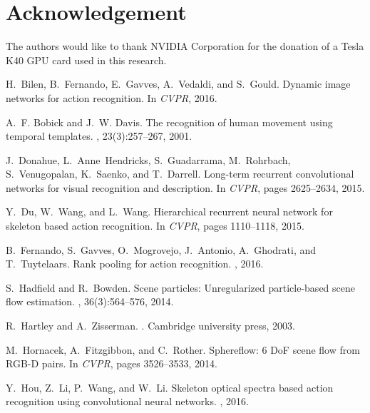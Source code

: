 \documentclass[10pt,twocolumn,letterpaper]{article}
\begin{document}
\section*{Acknowledgement}
The authors would like to thank NVIDIA Corporation for the donation of a Tesla K40 GPU card used in this research.

\small 
\begin{thebibliography}{10}\itemsep=-1pt

H.~Bilen, B.~Fernando, E.~Gavves, A.~Vedaldi, and S.~Gould.
\newblock Dynamic image networks for action recognition.
\newblock In {\em CVPR}, 2016.

A.~F. Bobick and J.~W. Davis.
\newblock The recognition of human movement using temporal templates.
,
  23(3):257--267, 2001.

J.~Donahue, L.~Anne~Hendricks, S.~Guadarrama, M.~Rohrbach, S.~Venugopalan,
  K.~Saenko, and T.~Darrell.
\newblock Long-term recurrent convolutional networks for visual recognition and
  description.
\newblock In {\em CVPR}, pages 2625--2634, 2015.

Y.~Du, W.~Wang, and L.~Wang.
\newblock Hierarchical recurrent neural network for skeleton based action
  recognition.
\newblock In {\em CVPR}, pages 1110--1118, 2015.

B.~Fernando, S.~Gavves, O.~Mogrovejo, J.~Antonio, A.~Ghodrati, and
  T.~Tuytelaars.
\newblock Rank pooling for action recognition.
,
  2016.

S.~Hadfield and R.~Bowden.
\newblock Scene particles: Unregularized particle-based scene flow estimation.
,
  36(3):564--576, 2014.

R.~Hartley and A.~Zisserman.
.
\newblock Cambridge university press, 2003.

M.~Hornacek, A.~Fitzgibbon, and C.~Rother.
\newblock Sphereflow: 6 {DoF} scene flow from {RGB-D} pairs.
\newblock In {\em CVPR}, pages 3526--3533, 2014.

Y.~Hou, Z.~Li, P.~Wang, and W.~Li.
\newblock Skeleton optical spectra based action recognition using convolutional
  neural networks.
,
  2016.


\end{thebibliography}
\end{document}
